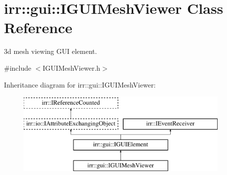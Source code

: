 \hypertarget{classirr_1_1gui_1_1IGUIMeshViewer}{}\section{irr\+:\+:gui\+:\+:I\+G\+U\+I\+Mesh\+Viewer Class Reference}
\label{classirr_1_1gui_1_1IGUIMeshViewer}


3d mesh viewing G\+UI element.  




{\ttfamily \#include $<$I\+G\+U\+I\+Mesh\+Viewer.\+h$>$}

Inheritance diagram for irr\+:\+:gui\+:\+:I\+G\+U\+I\+Mesh\+Viewer\+:\begin{figure}[H]
\begin{center}
\leavevmode
\includegraphics[height=4.000000cm]{classirr_1_1gui_1_1IGUIMeshViewer}
\end{center}
\end{figure}
